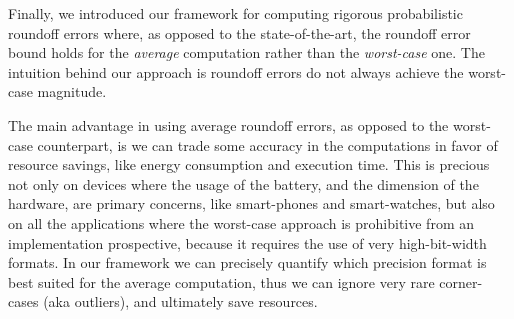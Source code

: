Finally, we introduced our framework for computing rigorous probabilistic roundoff errors where, as opposed to the state-of-the-art, the roundoff error bound holds for the \emph{average} computation rather than the \emph{worst-case} one.
%
The intuition behind our approach is roundoff errors do not always achieve the worst-case magnitude. 
%

The main advantage in using average roundoff errors, as opposed to the worst-case counterpart, is we can trade some accuracy in the computations in favor of resource savings, like energy consumption and execution time.
%
This is precious not only on devices where the usage of the battery, and the dimension of the hardware, are primary concerns, like smart-phones and smart-watches, but also on all the applications where the worst-case approach is prohibitive from an implementation prospective, because it requires the use of very high-bit-width formats. 
%
In our framework we can precisely quantify which precision format is best suited for the average computation, thus we can ignore very rare corner-cases (aka outliers), and ultimately save resources.
%